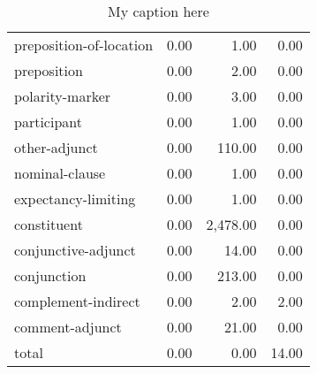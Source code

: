 \begin{table}[!ht]
\begin{tabular}{lrrr}
preposition-of-location   &     0.00 &                1.00 &                0.00 \\
preposition               &     0.00 &                2.00 &                0.00 \\
polarity-marker           &     0.00 &                3.00 &                0.00 \\
participant               &     0.00 &                1.00 &                0.00 \\
other-adjunct             &     0.00 &              110.00 &                0.00 \\
nominal-clause            &     0.00 &                1.00 &                0.00 \\
expectancy-limiting       &     0.00 &                1.00 &                0.00 \\
constituent               &     0.00 &            2,478.00 &                0.00 \\
conjunctive-adjunct       &     0.00 &               14.00 &                0.00 \\
conjunction               &     0.00 &              213.00 &                0.00 \\
complement-indirect       &     0.00 &                2.00 &                2.00 \\
comment-adjunct           &     0.00 &               21.00 &                0.00 \\
total                     &     0.00 &                0.00 &               14.00 \\
\bottomrule
\end{tabular}
\caption{My caption here}
\label{tab:constituency-general-data}
\end{table}